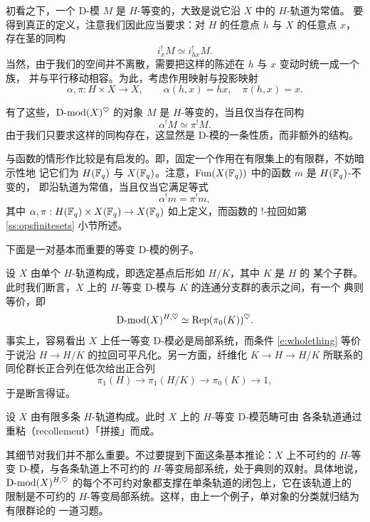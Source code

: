 初看之下，一个 D-模 $M$ 是 $H$-等变的，大致是说它沿 $X$ 中的 $H$-轨道为常值。
要得到真正的定义，注意我们因此应当要求：对 $H$ 的任意点 $h$ 与 $X$ 的任意点 $x$，
存在茎的同构
%
\begin{equation}\label{e:stalks}
i_x^! M \simeq i_{hx}^! M.
\end{equation}
%
当然，由于我们的空间并不离散，需要把这样的陈述在 $h$ 与 $x$ 变动时统一成一个族，
并与平行移动相容。为此，考虑作用映射与投影映射
%
\begin{equation}
\alpha, \pi: H \times X \rightarrow X,\quad \quad \alpha(h, x) = hx,
\quad \pi(h, x) = x.
\end{equation}
%

有了这些，$\operatorname{D-mod}(X)^\heartsuit$ 的对象 $M$ 是 $H$-等变的，当且仅当存在同构
%
\begin{equation} \label{e:wholething}
\alpha^! M \simeq \pi^! M.
\end{equation}
%
由于我们只要求这样的同构存在，这显然是 D-模的一条性质，而非额外的结构。

与函数的情形作比较是有启发的。即，固定一个作用在有限集上的有限群，不妨暗示性地
记它们为 $H(\mathbb{F}_q)$ 与 $X(\mathbb{F}_q)$。注意，$\operatorname{Fun}(X(\mathbb{F}_q))$ 中的函数 $m$ 是 $H(\mathbb{F}_q)$-不变的，
即沿轨道为常值，当且仅当它满足等式
%
\[
\alpha^! m = \pi^! m,
\]
%
其中 $\alpha, \pi: H(\mathbb{F}_q) \times X(\mathbb{F}_q) \rightarrow X(\mathbb{F}_q)$ 如上定义，而函数的
$!$-拉回如第 \ref{ss:opsfinitesets} 小节所述。

\ssszh 下面是一对基本而重要的等变 D-模的例子。

\begin{ex} 设 $X$ 由单个 $H$-轨道构成，即选定基点后形如 $H/K$，其中 $K$ 是 $H$ 的
某个子群。此时我们断言，$X$ 上的 $H$-等变 D-模与 $K$ 的连通分支群的表示之间，有一个
典则等价，即
%
\[
\operatorname{D-mod}(X)^{H, \heartsuit} \simeq \operatorname{Rep}(\pi_0(K))^{\heartsuit}.
\]
%
事实上，容易看出 $X$ 上任一等变 D-模必是局部系统，而条件 \eqref{e:wholething}
等价于说沿 $H \rightarrow H/K$ 的拉回可平凡化。另一方面，纤维化
$K \rightarrow H \rightarrow H/K$ 所联系的同伦群长正合列在低次给出正合列
%
\[
\pi_1(H) \rightarrow \pi_1(H/K) \rightarrow \pi_0(K) \rightarrow 1,
\]
%
于是断言得证。 \label{e:oneorbit}
\end{ex}

\begin{ex} 设 $X$ 由有限多条 $H$-轨道构成。此时 $X$ 上的 $H$-等变 D-模范畴可由
各条轨道通过重粘（recollement）「拼接」而成。

其细节对我们并不那么重要。不过要提到下面这条基本推论：$X$ 上不可约的 $H$-等变
D-模，与各条轨道上不可约的 $H$-等变局部系统，处于典则的双射。具体地说，
$\operatorname{D-mod}(X)^{H, \heartsuit}$ 的每个不可约对象都支撑在单条轨道的闭包上，它在该轨道上的
限制是不可约的 $H$-等变局部系统。这样，由上一个例子，单对象的分类就归结为有限群论的
一道习题。

\label{e:bigbrain}
\end{ex}

